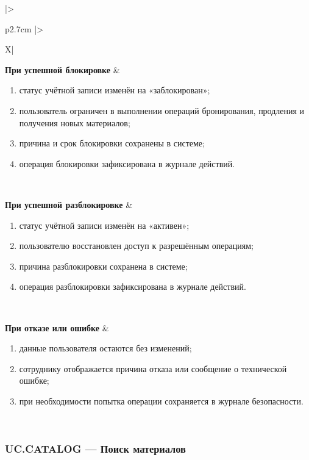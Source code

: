 \documentclass[12pt,a4paper]{article}
\begin{document}
\begin{xltabular}{\textwidth}{
			|>{\raggedright\arraybackslash}p{2.7cm}
			|>{\raggedright\arraybackslash}X|
		}
		\textbf{При успешной блокировке} &
		\begin{enumerate}
			\item статус учётной записи изменён на «заблокирован»;
			\item пользователь ограничен в выполнении операций бронирования,
			продления и получения новых материалов;
			\item причина и срок блокировки сохранены в системе;
			\item операция блокировки зафиксирована в журнале действий.
		\end{enumerate} \\
		\hline
		
		\textbf{При успешной разблокировке} &
		\begin{enumerate}
			\item статус учётной записи изменён на «активен»;
			\item пользователю восстановлен доступ к разрешённым операциям;
			\item причина разблокировки сохранена в системе;
			\item операция разблокировки зафиксирована в журнале действий.
		\end{enumerate} \\
		\hline
		
		\textbf{При отказе или ошибке} &
		\begin{enumerate}
			\item данные пользователя остаются без изменений;
			\item сотруднику отображается причина отказа или сообщение о
			технической ошибке;
			\item при необходимости попытка операции сохраняется в журнале
			безопасности.
		\end{enumerate} \\
		\hline
		
	\end{xltabular}
	
	\label{tab:uc-user-management-specification}
	
	\clearpage
	
	\subsubsection{UC.CATALOG --- Поиск материалов}
	
\end{document}
